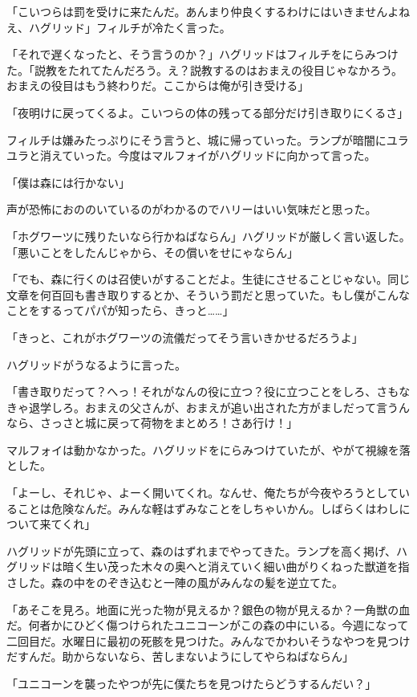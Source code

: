 \documentclass[10pt,a4paper]{article}
\begin{document}
\begin{CJK}{UTF8}{min}
「こいつらは罰を受けに来たんだ。あんまり仲良くするわけにはいきませんよねえ、ハグリッド」フィルチが冷たく言った。

「それで遅くなったと、そう言うのか？」ハグリッドはフィルチをにらみつけた。「説教をたれてたんだろう。え？説教するのはおまえの役目じゃなかろう。おまえの役目はもう終わりだ。ここからは俺が引き受ける」

「夜明けに戻ってくるよ。こいつらの体の残ってる部分だけ引き取りにくるさ」

フィルチは嫌みたっぷりにそう言うと、城に帰っていった。ランプが暗闇にユラユラと消えていった。今度はマルフォイがハグリッドに向かって言った。

「僕は森には行かない」

声が恐怖におののいているのがわかるのでハリーはいい気味だと思った。

「ホグワーツに残りたいなら行かねばならん」ハグリッドが厳しく言い返した。「悪いことをしたんじゃから、その償いをせにゃならん」

「でも、森に行くのは召使いがすることだよ。生徒にさせることじゃない。同じ文章を何百回も書き取りするとか、そういう罰だと思っていた。もし僕がこんなことをするってパパが知ったら、きっと……」

「きっと、これがホグワーツの流儀だってそう言いきかせるだろうよ」

ハグリッドがうなるように言った。

「書き取りだって？へっ！それがなんの役に立つ？役に立つことをしろ、さもなきゃ退学しろ。おまえの父さんが、おまえが追い出された方がましだって言うんなら、さっさと城に戻って荷物をまとめろ！さあ行け！」

マルフォイは動かなかった。ハグリッドをにらみつけていたが、やがて視線を落とした。

「よーし、それじゃ、よーく開いてくれ。なんせ、俺たちが今夜やろうとしていることは危険なんだ。みんな軽はずみなことをしちゃいかん。しばらくはわしについて来てくれ」

ハグリッドが先頭に立って、森のはずれまでやってきた。ランプを高く掲げ、ハグリッドは暗く生い茂った木々の奥へと消えていく細い曲がりくねった獣道を指さした。森の中をのぞき込むと一陣の風がみんなの髪を逆立てた。

「あそこを見ろ。地面に光った物が見えるか？銀色の物が見えるか？一角獣の血だ。何者かにひどく傷つけられたユニコーンがこの森の中にいる。今週になって二回目だ。水曜日に最初の死骸を見つけた。みんなでかわいそうなやつを見つけだすんだ。助からないなら、苦しまないようにしてやらねばならん」

「ユニコーンを襲ったやつが先に僕たちを見つけたらどうするんだい？」


\end{CJK}
\end{document}
